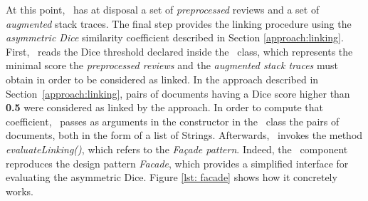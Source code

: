 At this point, \toolname\ has at disposal a set of \textit{preprocessed} reviews and a set of \textit{augmented} stack traces. 
The final step provides the linking procedure using the \textit{asymmetric Dice} similarity coefficient described in Section \ref{approach:linking}. \\
First, \toolname\ reads the Dice threshold declared inside the \Linker\ class, which represents the minimal score the \textit{preprocessed reviews} and the \textit{augmented stack traces} must obtain in order to be considered as linked. 
In the approach described in Section~\ref{approach:linking}, pairs of documents having a Dice score higher than \textbf{0.5} were considered as linked by the approach.
In order to compute that coefficient, \toolname\ passes as arguments in the constructor in the \Linker\ class the pairs of documents, both in the form of a list of Strings. 
Afterwards, \Linker\ invokes the method \textit{evaluateLinking()}, which refers to the \textit{Façade pattern}. 
Indeed, the \Facade\ component reproduces the design pattern \textit{Facade}, 
which provides a simplified interface for evaluating the asymmetric Dice. 
Figure \ref{lst: facade} shows how it concretely works. 
\clearpage



